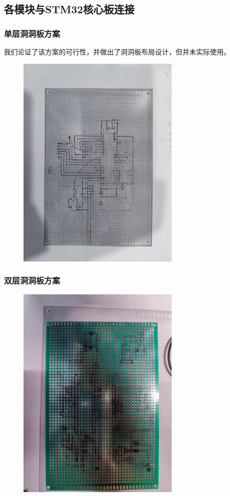 \documentclass[a4paper,11pt,UTF8]{ctexart}
\newcommand{\bottomcaption}{%
\setlength{\abovecaptionskip}{6bp}%
\setlength{\belowcaptionskip}{6bp}%
\caption}
\newcommand{\xiaowuhao}{\fontsize{9bp}{9bp}\selectfont}   %
\begin{document}
\subsection{各模块与STM32核心板连接}

\subsubsection{单层洞洞板方案}

我们论证了该方案的可行性，并做出了洞洞板布局设计，但并未实际使用。

\begin{figure}[!htbp]
    \centering
    \includegraphics[width=8cm, angle=270]{image10.jpeg}
    \bottomcaption{\xiaowuhao{单层洞洞板设计图}}
\end{figure}

\subsubsection{双层洞洞板方案}

\begin{figure}[!htbp]
    \centering
    \includegraphics[width=8cm, angle=270]{image11.jpeg}
    \bottomcaption{\xiaowuhao{双层洞洞板设计图}}
\end{figure}
\end{document}
